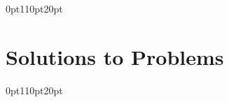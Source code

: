 \documentclass[letterpaper,11pt]{book}
\newif\ifshowbackmatter
\begin{document}
\addnewlinetotoc{}

\newpage{}
\endgroup{}

\fi  %



\ifshowbackmatter


% 

\backmatter{}

\titleformat{\chapter}[display]
{\normalfont\huge\bfseries\sffamily}{}{25pt}{\chaptitlenonumber}
\titlespacing*{\chapter} {0pt}{110pt}{20pt}


\addnewlinetotoc{}
\clearpage{}


\chapter[\bf Solutions to Problems]{Solutions to Problems}

\setcounter{chapter}{16}
\renewcommand{\thefigure}{\Alph{chapter}.\arabic{figure}}



\clearpage


\titleformat{\chapter}[display]
{\normalfont\huge\bfseries\sffamily}{}{25pt}{\chaptitlenonumber}
\titlespacing*{\chapter} {0pt}{110pt}{20pt}
\end{document}

